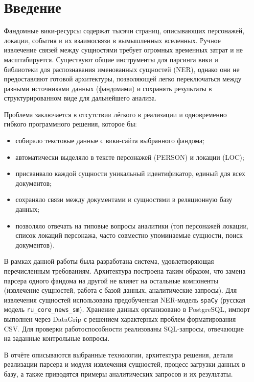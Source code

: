 \section{Введение}
\thispagestyle{withCompileDate}

Фандомные вики-ресурсы содержат тысячи страниц, описывающих персонажей, локации, события и их взаимосвязи в вымышленных вселенных. Ручное извлечение связей между сущностями требует огромных временных затрат и не масштабируется. Существуют общие инструменты для парсинга вики и библиотеки для распознавания именованных сущностей (NER), однако они не предоставляют готовой архитектуры, позволяющей легко переключаться между разными источниками данных (фандомами) и сохранять результаты в структурированном виде для дальнейшего анализа.

Проблема заключается в отсутствии лёгкого в реализации и одновременно гибкого программного решения, которое бы:
\begin{itemize}
    \item собирало текстовые данные с вики-сайта выбранного фандома;
    \item автоматически выделяло в тексте персонажей (PERSON) и локации (LOC);
    \item присваивало каждой сущности уникальный идентификатор, единый для всех документов;
    \item сохраняло связи между документами и сущностями в реляционную базу данных;
    \item позволяло отвечать на типовые вопросы аналитики (топ персонажей локации, список локаций персонажа, часто совместно упоминаемые сущности, поиск документов).
\end{itemize}

В рамках данной работы была разработана система, удовлетворяющая перечисленным требованиям. Архитектура построена таким образом, что замена парсера одного фандома на другой не влияет на остальные компоненты (извлечение сущностей, работа с базой данных, аналитические запросы). Для извлечения сущностей использована предобученная NER-модель \texttt{spaCy} (русская модель \texttt{ru\_core\_news\_sm}). Хранение данных организовано в PostgreSQL, импорт выполнен через DataGrip с решением характерных проблем форматирования CSV. Для проверки работоспособности реализованы SQL-запросы, отвечающие на заданные контрольные вопросы.

В отчёте описываются выбранные технологии, архитектура решения, детали реализации парсера и модуля извлечения сущностей, процесс загрузки данных в базу, а также приводятся примеры аналитических запросов и их результаты.
